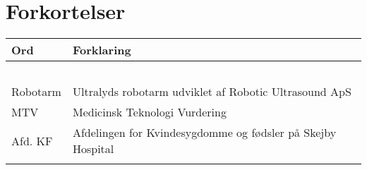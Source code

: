 \chapter{Forkortelser}

\begin{longtabu} to 
    Ord &    Forklaring\\
    \toprule\ \\
    Robotarm & Ultralyds robotarm udviklet af Robotic Ultrasound ApS \\
    MTV & Medicinsk Teknologi Vurdering \\
  	Afd. KF & Afdelingen for Kvindesygdomme og fødsler på Skejby Hospital \\
   
\label{forkort}
\end{longtabu}